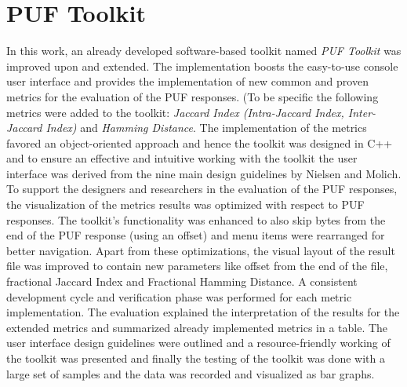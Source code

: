 \section{PUF Toolkit}
In this work, an already developed software-based toolkit named \emph{PUF Toolkit} was improved upon and extended. The implementation boosts the easy-to-use console user interface and provides the implementation of new common and proven metrics for the evaluation of the PUF responses. (To be specific the following metrics were added to the toolkit: \emph{Jaccard Index (Intra-Jaccard Index, Inter-Jaccard Index)} and \emph{Hamming Distance}. The implementation of the metrics favored an
	object-oriented approach and hence the toolkit was designed in C++ and to ensure an effective and intuitive working with the toolkit the user interface was derived from the nine main design guidelines by Nielsen and Molich\cite{67}. To support the designers and researchers in the evaluation of the PUF responses, the visualization of the metrics results was optimized with respect to PUF responses. The toolkit's functionality was enhanced to also skip bytes from the end of the PUF response
	(using an offset) and menu items were rearranged for better navigation. Apart from
these optimizations, the visual layout of the result file was improved to contain new parameters like offset from the end of the file, fractional Jaccard Index and Fractional Hamming Distance. A consistent development cycle and verification phase was performed for each metric implementation. The evaluation explained the interpretation of the results for the extended metrics and summarized already implemented metrics in a table. The user interface design guidelines were outlined
and a resource-friendly working of the toolkit was presented and finally the testing of the toolkit was done with a large set of samples and the data was recorded and visualized as bar graphs.\\


